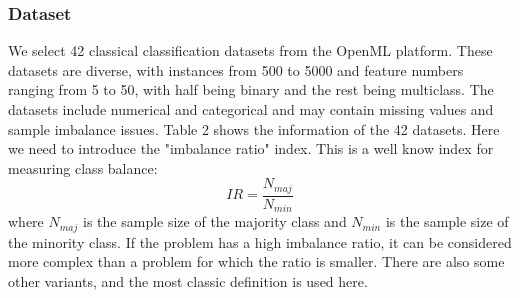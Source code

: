 \documentclass[review]{elsarticle}
\begin{document}
\subsubsection{Dataset}
 We select 42 classical classification datasets from the OpenML platform. These datasets are diverse, with instances from 500 to 5000 and feature numbers ranging from 5 to 50, with half being binary and the rest being multiclass. The datasets include numerical and categorical and may contain missing values and sample imbalance issues. Table 2 shows the information of the 42 datasets.
 Here we need to introduce the "imbalance ratio" index. This is a well know index for measuring class balance:
 \begin{equation}
 	IR=\frac{N_{maj}}{N_{min}}
 \end{equation} where $N_{maj}$ is the sample size of the majority class and $N_{min}$ is the sample size of the minority class. If the problem has a high imbalance ratio, it can be considered more complex than a problem for which the ratio is smaller. There are also some other variants, and the most classic definition is used here\cite{DBLP:journals/csur/LorenaGLSH19}.
\end{document}
